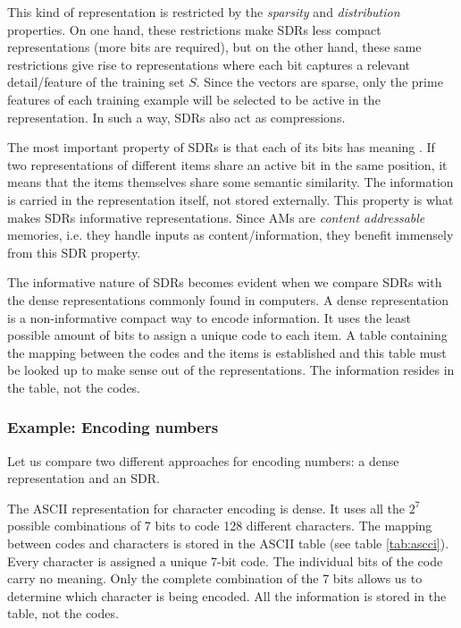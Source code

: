 \documentclass[runningheads]{llncs}
\begin{document}
This kind of representation is restricted by the \textit{sparsity} and \textit{distribution} properties. On one hand, these restrictions make SDRs less compact representations (more bits are required), but on the other hand, these same restrictions give rise to representations where each bit captures a relevant detail/feature of the training set $S$.
Since the vectors are sparse, only the prime features of each training example will be selected to be active in the representation. In such a way, SDRs also act as compressions.

The most important property of SDRs is that each of its bits has meaning \cite{Hawkins-et-al-2016-Book}. If two representations of different items share an active bit in the same position, it means that the items themselves share some semantic similarity. The information is carried in the representation itself, not stored externally. This property is what makes SDRs informative representations.
Since AMs are \textit{content addressable} memories, i.e. they handle inputs as content/information, they benefit immensely from this SDR property.

The informative nature of SDRs becomes evident when we compare SDRs with the dense representations commonly found in computers. A dense representation is a non-informative compact way to encode information. It uses the least possible amount of bits to assign a unique code to each item. A table containing the mapping between the codes and the items is established and this table must be looked up to make sense out of the representations. The information resides in the table, not the codes.

\subsubsection{Example: Encoding numbers}
\label{sec:inputoutput_example}
Let us compare two different approaches for encoding numbers: a dense representation and an SDR.

The ASCII representation for character encoding is dense. It uses all the $2^7$ possible combinations of 7 bits to code 128 different characters. The mapping between codes and characters is stored in the ASCII table (see table \ref{tab:ascci}). Every character is assigned a unique 7-bit code. The individual bits of the code carry no meaning. Only the complete combination of the 7 bits allows us to determine which character is being encoded. All the information is stored in the table, not the codes.
\end{document}
